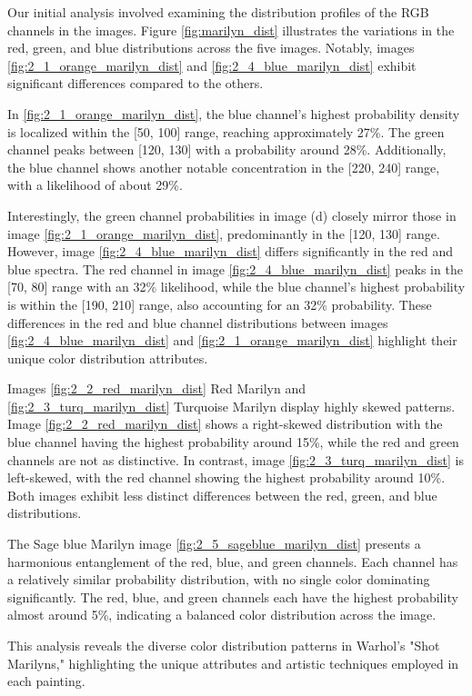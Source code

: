 \documentclass{article}
\begin{document}
Our initial analysis involved examining the distribution profiles of the
RGB channels in the images. Figure \ref{fig:marilyn_dist} illustrates the variations in the
red, green, and blue distributions across the five images. Notably,
images \ref{fig:2_1_orange_marilyn_dist} and \ref{fig:2_4_blue_marilyn_dist} exhibit significant differences compared to the
others.

In \ref{fig:2_1_orange_marilyn_dist}, the blue channel's highest probability
density is localized within the {[}50, 100{]} range, reaching
approximately 27\%. The green channel peaks between {[}120, 130{]} with
a probability around 28\%. Additionally, the blue channel shows another
notable concentration in the {[}220, 240{]} range, with a likelihood of
about 29\%.

Interestingly, the green channel probabilities in image (d) closely
mirror those in image \ref{fig:2_1_orange_marilyn_dist}, predominantly in the {[}120, 130{]} range.
However, image \ref{fig:2_4_blue_marilyn_dist} differs significantly in the red and blue spectra.
The red channel in image \ref{fig:2_4_blue_marilyn_dist} peaks in the {[}70, 80{]} range with an
32\% likelihood, while the blue channel's highest probability is within
the {[}190, 210{]} range, also accounting for an 32\% probability. These
differences in the red and blue channel distributions between images \ref{fig:2_4_blue_marilyn_dist}
and \ref{fig:2_1_orange_marilyn_dist} highlight their unique color distribution attributes.

Images \ref{fig:2_2_red_marilyn_dist} Red Marilyn and \ref{fig:2_3_turq_marilyn_dist} Turquoise Marilyn display highly skewed
patterns. Image \ref{fig:2_2_red_marilyn_dist} shows a right-skewed distribution with the blue
channel having the highest probability around 15\%, while the red and
green channels are not as distinctive. In contrast, image \ref{fig:2_3_turq_marilyn_dist} is
left-skewed, with the red channel showing the highest probability around
10\%. Both images exhibit less distinct differences between the red,
green, and blue distributions.

The Sage blue Marilyn image \ref{fig:2_5_sageblue_marilyn_dist} presents a harmonious entanglement of
the red, blue, and green channels. Each channel has a relatively similar
probability distribution, with no single color dominating significantly.
The red, blue, and green channels each have the highest probability almost
around 5\%, indicating a balanced color distribution across the image.

This analysis reveals the diverse color distribution patterns in
Warhol's "Shot Marilyns," highlighting the unique attributes and
artistic techniques employed in each painting.
\end{document}
